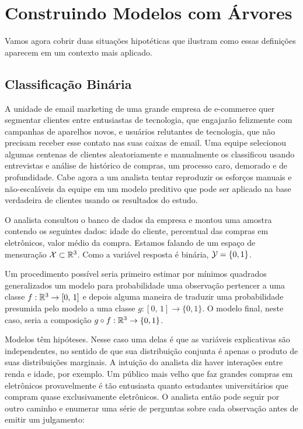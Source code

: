 \section{Construindo Modelos com Árvores}

Vamos agora cobrir duas situações hipotéticas que ilustram como essas definições aparecem em um contexto mais aplicado.

\subsection{Classificação Binária}

 A unidade de email marketing de uma grande empresa de e-commerce quer segmentar clientes entre entusiastas de tecnologia, que engajarão felizmente com campanhas de aparelhos novos, e usuários relutantes de tecnologia, que não precisam receber esse contato nas suas caixas de email. Uma equipe selecionou algumas centenas de clientes aleatoriamente e manualmente os classificou usando entrevistas e análise de histórico de compras, um processo caro, demorado e de profundidade. Cabe agora a um analista tentar reproduzir os esforços manuais e não-escaláveis da equipe em um modelo preditivo que pode ser aplicado na base verdadeira de clientes usando os resultados do estudo.

O analista consultou o banco de dados da empresa e montou uma amostra contendo os seguintes dados: idade do cliente, percentual das compras em eletrônicos, valor médio da compra. Estamos falando de um espaço de mensuração $\mathcal{X} \subset \mathbb{R}^3$. Como a variável resposta é binária, $\mathcal{Y} = \{0, 1\}$. 

Um procedimento possível seria primeiro estimar por mínimos quadrados generalizados um modelo para probabilidade uma observação pertencer a uma classe $f: \mathbb{R}^3 \to [0, \, 1]$ e depois alguma maneira de traduzir uma probabilidade presumida pelo modelo a uma classe $g: [0, \, 1] \to \{0, 1\}$. O modelo final, neste caso, seria a composição $g \circ f: \mathbb{R}^3 \to \{0, 1\} $.

Modelos têm hipóteses. Nesse caso uma delas é que as variáveis explicativas são independentes, no sentido de que sua distribuição conjunta é apenas o produto de suas distribuições marginais. A intuição do analista diz haver interações entre renda e idade, por exemplo. Um público mais velho que faz grandes compras em eletrônicos provavelmente é tão entusiasta quanto estudantes universitários que compram quase exclusivamente eletrônicos. O analista então pode seguir por outro caminho e enumerar uma série de perguntas sobre cada observação antes de emitir um julgamento:

